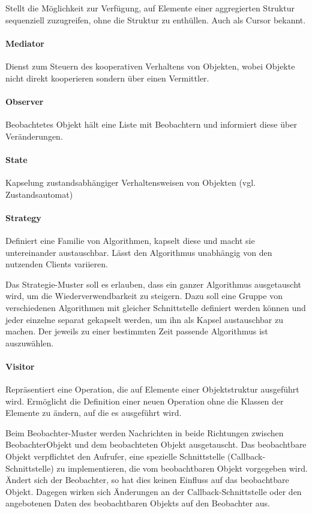 Stellt die Möglichkeit zur Verfügung, auf Elemente einer aggregierten Struktur
sequenziell zuzugreifen, ohne die Struktur zu enthüllen. Auch als Cursor
bekannt.

\paragraph{Mediator}\label{mediator}

Dienst zum Steuern des kooperativen Verhaltens von Objekten, wobei Objekte
nicht direkt kooperieren sondern über einen Vermittler.

\paragraph{Observer}\label{observer}

Beobachtetes Objekt hält eine Liste mit Beobachtern und informiert diese über
Veränderungen.

\paragraph{State}\label{state}

Kapselung zustandsabhängiger Verhaltensweisen von Objekten (vgl.
Zustandsautomat)

\paragraph{Strategy}\label{strategy}

Definiert eine Familie von Algorithmen, kapselt diese und macht sie
untereinander austauschbar. Lässt den Algorithmus unabhängig von den nutzenden
Clients variieren.

Das Strategie-Muster soll es erlauben, dass ein ganzer Algorithmus ausgetauscht
wird, um die Wiederverwendbarkeit zu steigern. Dazu soll eine Gruppe von
verschiedenen Algorithmen mit gleicher Schnittstelle definiert werden können und
jeder einzelne separat gekapselt werden, um ihn als Kapsel austauschbar zu
machen. Der jeweils zu einer bestimmten Zeit passende Algorithmus ist
auszuwählen.

\paragraph{Visitor}\label{visitor}

Repräsentiert eine Operation, die auf Elemente einer Objektstruktur ausgeführt
wird. Ermöglicht die Definition einer neuen Operation ohne die Klassen der
Elemente zu ändern, auf die es ausgeführt wird.

Beim Beobachter-Muster werden Nachrichten in beide Richtungen zwischen
BeobachterObjekt und dem beobachteten Objekt ausgetauscht. Das beobachtbare
Objekt verpflichtet den Aufrufer, eine spezielle Schnittstelle
(Callback-Schnittstelle) zu implementieren, die vom beobachtbaren Objekt
vorgegeben wird. Ändert sich der Beobachter, so hat dies keinen Einfluss auf das
beobachtbare Objekt. Dagegen wirken sich Änderungen an der
Callback-Schnittstelle oder den angebotenen Daten des beobachtbaren Objekts auf
den Beobachter aus.
